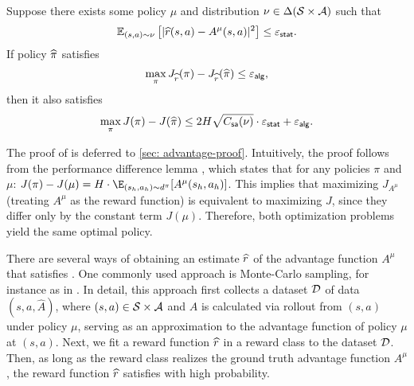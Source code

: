 \documentclass{article}
\begin{document}
\begin{theorem}\label{thm: advantage}
    Suppose there exists some policy $\mu$ and distribution $\nu\in \Delta(\mathcal{S}\times\mathcal{A})$ such that 
    \begin{equation}\label{eq: epsilon-stat}
        \mathbb{E}_{(s, a)\sim \nu}\left[|\widehat{r}(s, a) - A^\mu(s, a)|^2\right]\le \varepsilon_{\sf stat}.
    \end{equation}
    If policy $\widehat{\pi}$ satisfies
    \begin{equation}\label{eq: epsilon-alg}
        \max_{\pi} J_{\widehat{r}}(\pi) - J_{\widehat{r}}(\widehat{\pi}) \leq \varepsilon_{\sf alg},
    \end{equation}
    then it also satisfies
    $$\max_{\pi} J(\pi) - J(\widehat{\pi}) \le 2H\sqrt{C_{\mathsf{sa}}(\nu)}\cdot \varepsilon_{\sf stat} + \varepsilon_{\sf alg}.$$
\end{theorem}
The proof of  is deferred to \cref{sec: advantage-proof}.
Intuitively, the proof follows from the performance difference lemma \citep{kakade2002approximately}, which states that for any policies $\pi$ and $\mu$:
$J(\pi) - J(\mu) = H\cdot\E_{(s_h,a_h) \sim d^\pi}[ A^\mu(s_h,a_h)]$.
This implies that maximizing $J_{A^\mu}$ (treating $A^\mu$ as the reward function) is equivalent to maximizing $J$, since they differ only by the constant term $J(\mu)$. Therefore, both optimization problems yield the same optimal policy.



    There are several ways of obtaining an estimate $\widehat{r}$ of the advantage function $A^\mu$ that satisfies . One commonly used approach is Monte-Carlo sampling, for instance as in  \citet{setlur2024rewarding}. In detail, this approach first collects a dataset $\mathcal{D}$ of data $(s, a, \widehat{A})$, where $(s, a)\in \mathcal{S}\times \mathcal{A}$ and $\widehat{A}$ is calculated via rollout from $(s, a)$ under policy $\mu$, serving as an approximation to the advantage function of policy $\mu$ at $(s, a)$. Next, we fit a reward function $\widehat{r}$ in a reward class to the dataset $\mathcal{D}$. Then, as long as the reward class realizes the ground truth advantage function $A^\mu$, the reward function $\widehat{r}$ satisfies  with high probability.
\end{document}
